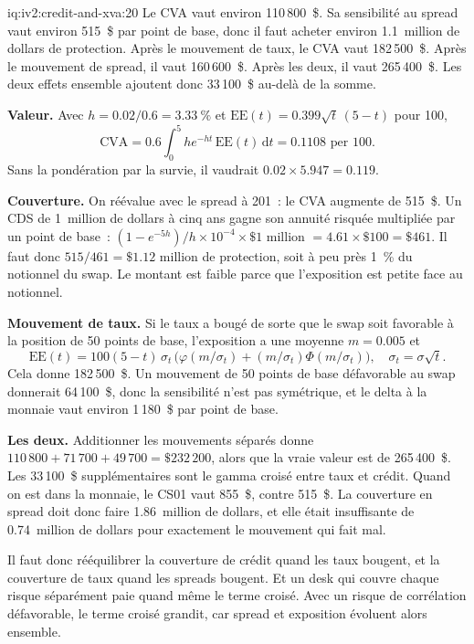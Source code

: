 \begin{solution}{iq:iv2:credit-and-xva:20}
Le CVA vaut environ 110\,800~\$. Sa sensibilité au spread vaut environ 515~\$ par point de base, donc il faut acheter environ 1.1~million de dollars de protection. Après le mouvement de taux, le CVA vaut 182\,500~\$. Après le mouvement de spread, il vaut 160\,600~\$. Après les deux, il vaut 265\,400~\$. Les deux effets ensemble ajoutent donc 33\,100~\$ au-delà de la somme.

\textbf{Valeur.} Avec $h = 0.02/0.6 = 3.33~\%$ et $\mathrm{EE}(t) = 0.399\sqrt{t}\,(5 - t)$ pour 100,
\[
\mathrm{CVA} = 0.6 \int_0^5 h e^{-ht}\,\mathrm{EE}(t)\,\mathrm{d}t = 0.1108 \text{ per } 100.
\]
Sans la pondération par la survie, il vaudrait $0.02 \times 5.947 = 0.119$.

\textbf{Couverture.} On réévalue avec le spread à 201~: le CVA augmente de 515~\$. Un CDS de 1~million de dollars à cinq ans gagne son annuité risquée multipliée par un point de base~: $(1 - e^{-5h})/h \times 10^{-4} \times \$1$ million $= 4.61 \times \$100 = \$461$. Il faut donc $515/461 = \$1.12$ million de protection, soit à peu près 1~\% du notionnel du swap. Le montant est faible parce que l'exposition est petite face au notionnel.

\textbf{Mouvement de taux.} Si le taux a bougé de sorte que le swap soit favorable à la position de 50 points de base, l'exposition a une moyenne $m = 0.005$ et
\[
\mathrm{EE}(t) = 100(5 - t)\,\sigma_t\,\bigl(\varphi(m/\sigma_t) + (m/\sigma_t)\Phi(m/\sigma_t)\bigr), \quad \sigma_t = \sigma\sqrt{t}.
\]
Cela donne 182\,500~\$. Un mouvement de 50 points de base défavorable au swap donnerait 64\,100~\$, donc la sensibilité n'est pas symétrique, et le delta à la monnaie vaut environ 1\,180~\$ par point de base.

\textbf{Les deux.} Additionner les mouvements séparés donne $110\,800 + 71\,700 + 49\,700 = \$232\,200$, alors que la vraie valeur est de 265\,400~\$. Les 33\,100~\$ supplémentaires sont le gamma croisé entre taux et crédit. Quand on est dans la monnaie, le CS01 vaut 855~\$, contre 515~\$. La couverture en spread doit donc faire 1.86~million de dollars, et elle était insuffisante de 0.74~million de dollars pour exactement le mouvement qui fait mal.

Il faut donc rééquilibrer la couverture de crédit quand les taux bougent, et la couverture de taux quand les spreads bougent. Et un desk qui couvre chaque risque séparément paie quand même le terme croisé. Avec un risque de corrélation défavorable, le terme croisé grandit, car spread et exposition évoluent alors ensemble.


\end{solution}
